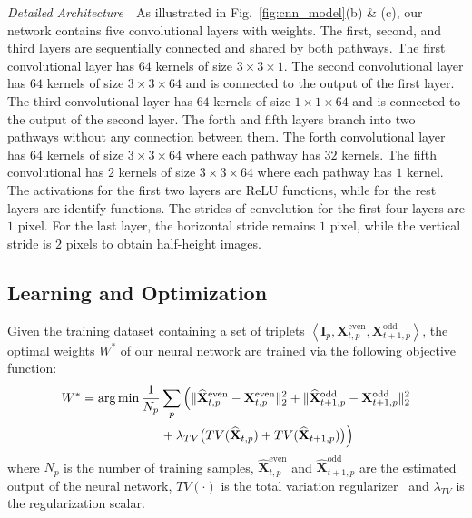 \vspace{0.15in}
\noindent\emph{Detailed Architecture}\,\,\,\,
As illustrated in Fig.~\ref{fig:cnn_model}(b) \& (c), our network contains five convolutional layers with weights.
The first, second, and third layers are sequentially connected and shared by both pathways.
The first convolutional layer has $64$ kernels of size $3\times3\times1$.
The second convolutional layer has $64$ kernels of size $3\times3\times64$ and is connected to the output of the first layer.
The third convolutional layer has $64$ kernels of size $1\times1\times64$ and is connected to the output of the second layer.
The forth and fifth layers branch into two pathways without any connection between them.
The forth convolutional layer has $64$ kernels of size $3\times3\times64$ where each pathway has $32$ kernels.
The fifth convolutional has $2$ kernels of size $3\times3\times64$ where each pathway has $1$ kernel.
The activations for the first two layers are ReLU functions, while for the rest layers are identify functions.
The strides of convolution for the first four layers are $1$ pixel.
For the last layer, the horizontal stride remains $1$ pixel, while the vertical stride is $2$ pixels to obtain half-height images.

\subsection{Learning and Optimization}
Given the training dataset containing a set of triplets $\left\langle \mathbf{I}_p,\mathbf{X}^{\text{even}}_{t,p},\mathbf{X}^{\text{odd}}_{t+1,p}\right\rangle$, the optimal weights $W^*$ of our neural network are trained via the following objective function:
\begin{equation}\label{eq:objective}
\begin{split}
W^*=\operatorname*{\arg\min} \frac{1}{N_p} &\sum_p \Big(\|\widehat{\mathbf{X}}^{\text{even}}_{t,p}-\mathbf{X}^{\text{even}}_{t,p}\|^2_2+\|\widehat{\mathbf{X}}^{\text{odd}}_{t+1,p}-\mathbf{X}^{\text{odd}}_{t+1,p}\|^2_2\\
&+\lambda_{TV}\big(TV(\widehat{\mathbf{X}}_{t,p})+TV(\widehat{\mathbf{X}}_{t+1,p})\big)\Big)
\end{split}
\end{equation}
where $N_p$ is the number of training samples, $\widehat{\mathbf{X}}^{\text{even}}_{t,p}$ and $\widehat{\mathbf{X}}^{\text{odd}}_{t+1,p}$ are the estimated output of the neural network, $TV(\cdot)$ is the total variation regularizer~\cite{aly2005image,johnson2016perceptual} and $\lambda_{TV}$ is the regularization scalar.

